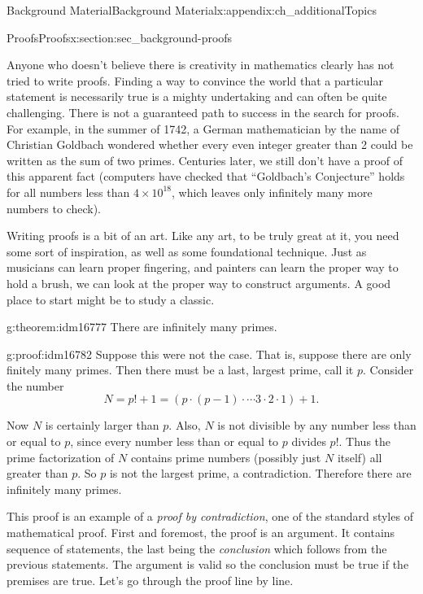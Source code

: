\documentclass[oneside,10pt,]{book}
\numberwithin{equation}{chapter}
\begin{document}
\begin{appendixptx}{Background Material}{}{Background Material}{}{}{x:appendix:ch_additionalTopics}
\begin{sectionptx}{Proofs}{}{Proofs}{}{}{x:section:sec_background-proofs}
\begin{introduction}{}
Anyone who doesn't believe there is creativity in mathematics clearly has not tried to write proofs. Finding a way to convince the world that a particular statement is necessarily true is a mighty undertaking and can often be quite challenging. There is not a guaranteed path to success in the search for proofs. For example, in the summer of 1742, a German mathematician by the name of Christian Goldbach wondered whether every even integer greater than 2 could be written as the sum of two primes. Centuries later, we still don't have a proof of this apparent fact (computers have checked that ``Goldbach's Conjecture'' holds for all numbers less than \(4\times 10^{18}\), which leaves only infinitely many more numbers to check).%
\par
Writing proofs is a bit of an art. Like any art, to be truly great at it, you need some sort of inspiration, as well as some foundational technique. Just as musicians can learn proper fingering, and painters can learn the proper way to hold a brush, we can look at the proper way to construct arguments. A good place to start might be to study a classic.%
\begin{theorem}{}{}{g:theorem:idm16777}%
There are infinitely many primes.%
\end{theorem}
\begin{proofptx}{}{g:proof:idm16782}
Suppose this were not the case. That is, suppose there are only finitely many primes. Then there must be a last, largest prime, call it \(p\). Consider the number%
\begin{equation*}
N = p! + 1 = (p \cdot (p-1) \cdot \cdots 3\cdot 2 \cdot 1) + 1.
\end{equation*}
%
\par
Now \(N\) is certainly larger than \(p\). Also, \(N\) is not divisible by any number less than or equal to \(p\), since every number less than or equal to \(p\) divides \(p!\). Thus the prime factorization of \(N\) contains prime numbers (possibly just \(N\) itself) all greater than \(p\). So \(p\) is not the largest prime, a contradiction. Therefore there are infinitely many primes.%
\end{proofptx}
This proof is an example of a \emph{proof by contradiction}, one of the standard styles of mathematical proof. First and foremost, the proof is an argument. It contains sequence of statements, the last being the \emph{conclusion} which follows from the previous statements. The argument is valid so the conclusion must be true if the premises are true. Let's go through the proof line by line.%

\end{introduction}
\end{sectionptx}
\end{appendixptx}
\end{document}
